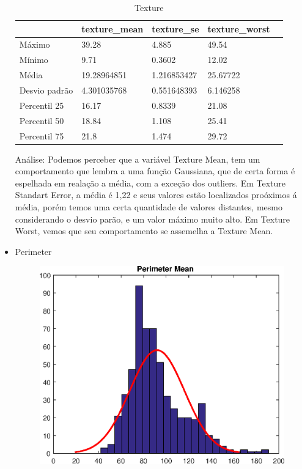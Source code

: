 \documentclass[11pt,a4paper]{article}
\numberwithin{equation}{section}
\begin{document}
\begin{itemize}
\begin{table}[H]
\centering
\caption{Texture}
\label{my-label}
\begin{tabular}{lllll}
\hline
              & texture\_mean & texture\_se & texture\_worst &  \\ \hline
Máximo        & 39.28         & 4.885       & 49.54          &  \\
Mínimo        & 9.71          & 0.3602      & 12.02          &  \\
Média         & 19.28964851   & 1.216853427 & 25.67722       &  \\
Desvio padrão & 4.301035768   & 0.551648393 & 6.146258       &  \\
Percentil 25  & 16.17         & 0.8339      & 21.08          &  \\
Percentil 50  & 18.84         & 1.108       & 25.41          &  \\
Percentil 75  & 21.8          & 1.474       & 29.72          & \\ \hline
\end{tabular}
\end{table}

Análise: Podemos perceber que a variável Texture Mean, tem um comportamento que lembra a uma função Gaussiana, que de certa forma é espelhada em realação a média, com a exceção dos outliers. Em Texture Standart Error, a média é 1,22  e seus valores estão localizados proóximos á média, porém temos uma certa quantidade de valores distantes, mesmo considerando o desvio parão, e um valor máximo muito alto. Em Texture Worst, vemos que seu comportamento se assemelha a Texture Mean.


\item Perimeter
\begin{figure}[H]
\centering
  \includegraphics[width=.4\linewidth]{./img/perimeter_mean}
  \label{fig:test1}
\end{figure}%


\end{itemize}
\end{document}
